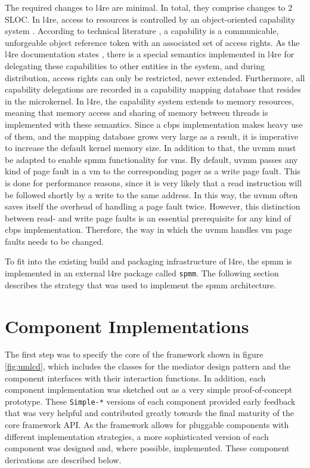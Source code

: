 The required changes to \ac{l4re} are minimal.
In total, they comprise changes to 2 SLOC.
In \ac{l4re}, access to resources is controlled by an object-oriented capability system \cite{l4re-capabilities}.
According to technical literature \cite{capability1999}, a capability is a communicable, unforgeable object reference token with an associated set of access rights.
As the \ac{l4re} documentation states \cite{l4re-capabilities}, there is a special semantics implemented in \ac{l4re} for delegating these capabilities to other entities in the system, and during distribution, access rights can only be restricted, never extended.
Furthermore, all capability delegations are recorded in a capability mapping database that resides in the microkernel.
In \ac{l4re}, the capability system extends to memory resources, meaning that memory access and sharing of memory between threads is implemented with these semantics.
Since a \ac{cbps} implementation makes heavy use of them, and the mapping database grows very large as a result, it is imperative to increase the default kernel memory size.
In addition to that, the \acf{uvmm} must be adapted to enable \ac{spmm} functionality for \acp{vm}.
By default, \ac{uvmm} passes any kind of page fault in a \ac{vm} to the corresponding pager as a write page fault.
This is done for performance reasons, since it is very likely that a read instruction will be followed shortly by a write to the same address.
In this way, the \ac{uvmm} often saves itself the overhead of handling a page fault twice.
However, this distinction between read- and write page faults is an essential prerequisite for any kind of \ac{cbps} implementation.
Therefore, the way in which the \ac{uvmm} handles \ac{vm} page faults needs to be changed.

To fit into the existing build and packaging infrastructure of \ac{l4re}, the \ac{spmm} is implemented in an external \ac{l4re} package called \texttt{spmm}.
The following section describes the strategy that was used to implement the \ac{spmm} architecture.

\section{Component Implementations}
\label{sec:component-implementations}

The first step was to specify the core of the framework shown in figure \ref{fig:umlcd}, which includes the classes for the mediator design pattern and the component interfaces with their interaction functions.
In addition, each component implementation was sketched out as a very simple proof-of-concept prototype.
These \texttt{Simple-*} versions of each component provided early feedback that was very helpful and contributed greatly towards the final maturity of the core framework API.
As the framework allows for pluggable components with different implementation strategies, a more sophisticated version of each component was designed and, where possible, implemented.
These component derivations are described below.

